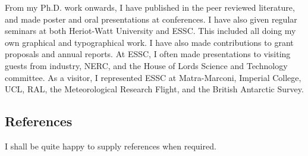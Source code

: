 \begin{flushleft}
From my Ph.D. work onwards, I have published in the peer reviewed literature,
and  made poster and oral presentations
at conferences.  I have also given regular seminars at both Heriot-Watt University
and ESSC. This included all doing my own  graphical
and typographical work.  I have also made  contributions to 
grant proposals and annual reports. At ESSC,  I often made presentations to visiting guests from industry,
 NERC, and the House of Lords Science and Technology committee. As a visitor, I represented
 ESSC at Matra-Marconi, Imperial College, UCL, RAL, the Meteorological Research Flight, and the British Antarctic Survey.

\end{flushleft}

\begin{flushleft}
\section{References}
I shall be quite happy to supply references when required.
\end{flushleft}









